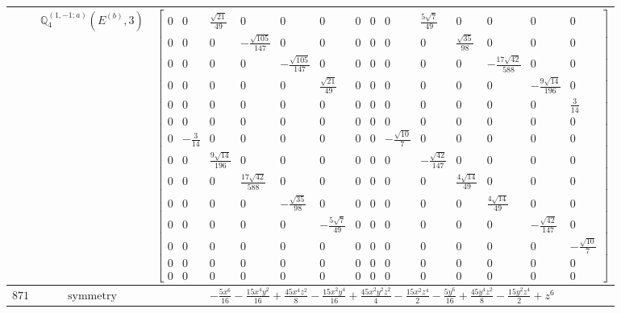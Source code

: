 \documentclass[fleqn,8pt,landscape]{jsarticle}
\begin{document}
\begin{longtable}{ccc}
$  $ & $ \mathbb{Q}_{4}^{(1,-1;a)}(E^{(b)},3) $ & $ \begin{bmatrix} 0 & 0 & \frac{\sqrt{21}}{49} & 0 & 0 & 0 & 0 & 0 & 0 & \frac{5 \sqrt{7}}{49} & 0 & 0 & 0 & 0 \\ 0 & 0 & 0 & - \frac{\sqrt{105}}{147} & 0 & 0 & 0 & 0 & 0 & 0 & \frac{\sqrt{35}}{98} & 0 & 0 & 0 \\ 0 & 0 & 0 & 0 & - \frac{\sqrt{105}}{147} & 0 & 0 & 0 & 0 & 0 & 0 & - \frac{17 \sqrt{42}}{588} & 0 & 0 \\ 0 & 0 & 0 & 0 & 0 & \frac{\sqrt{21}}{49} & 0 & 0 & 0 & 0 & 0 & 0 & - \frac{9 \sqrt{14}}{196} & 0 \\ 0 & 0 & 0 & 0 & 0 & 0 & 0 & 0 & 0 & 0 & 0 & 0 & 0 & \frac{3}{14} \\ 0 & 0 & 0 & 0 & 0 & 0 & 0 & 0 & 0 & 0 & 0 & 0 & 0 & 0 \\ 0 & - \frac{3}{14} & 0 & 0 & 0 & 0 & 0 & 0 & - \frac{\sqrt{10}}{7} & 0 & 0 & 0 & 0 & 0 \\ 0 & 0 & \frac{9 \sqrt{14}}{196} & 0 & 0 & 0 & 0 & 0 & 0 & - \frac{\sqrt{42}}{147} & 0 & 0 & 0 & 0 \\ 0 & 0 & 0 & \frac{17 \sqrt{42}}{588} & 0 & 0 & 0 & 0 & 0 & 0 & \frac{4 \sqrt{14}}{49} & 0 & 0 & 0 \\ 0 & 0 & 0 & 0 & - \frac{\sqrt{35}}{98} & 0 & 0 & 0 & 0 & 0 & 0 & \frac{4 \sqrt{14}}{49} & 0 & 0 \\ 0 & 0 & 0 & 0 & 0 & - \frac{5 \sqrt{7}}{49} & 0 & 0 & 0 & 0 & 0 & 0 & - \frac{\sqrt{42}}{147} & 0 \\ 0 & 0 & 0 & 0 & 0 & 0 & 0 & 0 & 0 & 0 & 0 & 0 & 0 & - \frac{\sqrt{10}}{7} \\ 0 & 0 & 0 & 0 & 0 & 0 & 0 & 0 & 0 & 0 & 0 & 0 & 0 & 0 \\ 0 & 0 & 0 & 0 & 0 & 0 & 0 & 0 & 0 & 0 & 0 & 0 & 0 & 0 \end{bmatrix} $ \\ \hline
$ 871 $ & $ \text{symmetry} $ & $ - \frac{5 x^{6}}{16} - \frac{15 x^{4} y^{2}}{16} + \frac{45 x^{4} z^{2}}{8} - \frac{15 x^{2} y^{4}}{16} + \frac{45 x^{2} y^{2} z^{2}}{4} - \frac{15 x^{2} z^{4}}{2} - \frac{5 y^{6}}{16} + \frac{45 y^{4} z^{2}}{8} - \frac{15 y^{2} z^{4}}{2} + z^{6} $ \\

\end{longtable}
\end{document}

